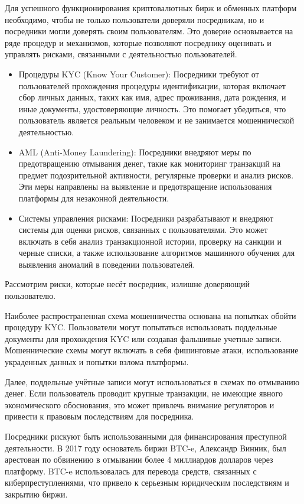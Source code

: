 Для успешного функционирования криптовалютных бирж и обменных платформ необходимо, чтобы не только пользователи доверяли посредникам, но и посредники могли доверять своим пользователям. Это доверие основывается на ряде процедур и механизмов, которые позволяют посреднику оценивать и управлять рисками, связанными с деятельностью пользователей.

\begin{itemize}
\item Процедуры KYC (Know Your Customer): Посредники требуют от пользователей прохождения процедуры идентификации, которая включает сбор личных данных, таких как имя, адрес проживания, дата рождения, и иные документы, удостоверяющие личность. Это помогает убедиться, что пользователь является реальным человеком и не занимается мошеннической деятельностью.

\item AML (Anti-Money Laundering): Посредники внедряют меры по предотвращению отмывания денег, такие как мониторинг транзакций на предмет подозрительной активности, регулярные проверки и анализ рисков. Эти меры направлены на выявление и предотвращение использования платформы для незаконной деятельности.

\item Системы управления рисками: Посредники разрабатывают и внедряют системы для оценки рисков, связанных с пользователями. Это может включать в себя анализ транзакционной истории, проверку на санкции и черные списки, а также использование алгоритмов машинного обучения для выявления аномалий в поведении пользователей.
\end{itemize}

Рассмотрим риски, которые несёт посредник, излишне доверяющий пользователю.

Наиболее распространенная схема мошенничества основана на попытках обойти процедуру KYC. Пользователи могут попытаться использовать поддельные документы для прохождения KYC или создавая фальшивые учетные записи. Мошеннические схемы могут включать в себя фишинговые атаки, использование украденных данных и попытки взлома платформы.

Далее, поддельные учётные записи могут использоваться в схемах по отмыванию денег. Если пользователь проводит крупные транзакции, не имеющие явного экономического обоснования, это может привлечь внимание регуляторов и привести к правовым последствиям для посредника.

Посредники рискуют быть использованными для финансирования преступной деятельности. В 2017 году основатель биржи BTC-e, Александр Винник, был арестован по обвинению в отмывании более 4 миллиардов долларов через платформу\cite{label26}. BTC-e использовалась для перевода средств, связанных с киберпреступлениями, что привело к серьезным юридическим последствиям и закрытию биржи.

